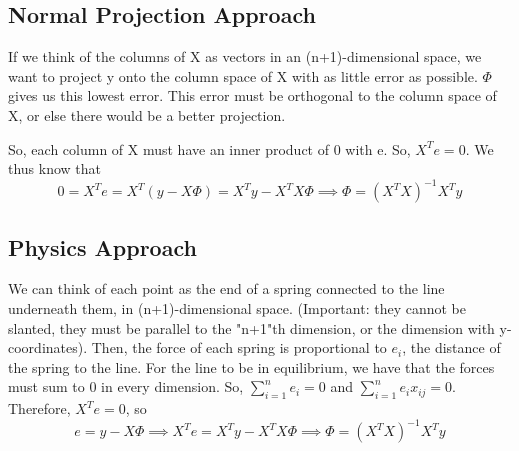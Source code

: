 \documentclass{article}
\begin{document}
\subsection{Normal Projection Approach}
If we think of the columns of X as vectors in an (n+1)-dimensional space, 
we want to project y onto the column space of X with as little error as possible.
$\Phi$ gives us this lowest error. This error must be orthogonal to the 
column space of X, or else there would be a better projection. 

So, each column of X must have an inner product of 0 with e. So, $X^Te = 0$. 
We thus know that \[
0 = X^Te = X^T(y - X\Phi) = X^Ty - X^TX\Phi \implies \Phi = (X^TX)^{-1}X^Ty\]

\subsection{Physics Approach}
We can think of each point as the end of a spring connected to the line 
underneath them, in (n+1)-dimensional space. (Important: they cannot
be slanted, they must be parallel to the "n+1"th dimension, or the dimension
with y-coordinates). Then, the force of each spring is proportional to $e_i$, 
the distance of the spring to the line. For the line to be in equilibrium, 
we have that the forces must sum to 0 in every dimension. So, 
$\sum_{i=1}^n e_i = 0$ and $\sum_{i=1}^n e_ix_{ij} = 0$. Therefore, 
$X^Te = 0$, so \[
e = y - X\Phi \implies X^Te = X^Ty - X^TX\Phi \implies \Phi = (X^TX)^{-1}X^Ty
\]
\end{document}
